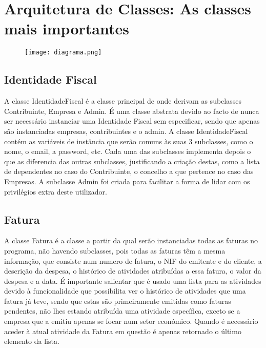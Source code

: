 \section{Arquitetura de Classes: As classes mais importantes}

\begin{figure}[!h]
	\centering
	\texttt{[image: diagrama.png]}
\end{figure}

\subsection{Identidade Fiscal}

A classe IdentidadeFiscal é a classe principal de onde derivam as subclasses Contribuinte, Empresa e Admin. É uma classe abstrata devido ao facto de nunca ser necessário instanciar uma Identidade Fiscal sem especificar, sendo que apenas são instanciadas empresas, contribuintes e o admin. A classe IdentidadeFiscal contém as variáveis de instância que serão comuns às suas 3 subclasses, como o nome, o email, a password, etc. Cada uma das subclasses implementa depois o que as diferencia das outras subclasses, justificando a criação destas, como a lista de dependentes no caso do Contribuinte, o concelho a que pertence no caso das Empresas. A subclasse Admin foi criada para facilitar a forma de lidar com os privilégios extra deste utilizador.

\subsection{Fatura}
A classe Fatura é a classe a partir da qual serão instanciadas todas as faturas no programa, não havendo subclasses, pois todas as faturas têm a mesma informação, que consiste num numero de fatura, o NIF do emitente e do cliente, a descrição da despesa, o histórico de atividades atribuídas a essa fatura, o valor da despesa e a data. É importante salientar que é usado uma lista para as atividades devido à funcionalidade que possibilita ver o histórico de atividades que uma fatura já teve, sendo que estas são primeiramente emitidas como faturas pendentes, não lhes estando atribuída uma atividade específica, exceto se a empresa que a emitiu apenas se focar num setor económico. Quando é necessário aceder à atual atividade da Fatura em questão é apenas retornado o último elemento da lista. 



